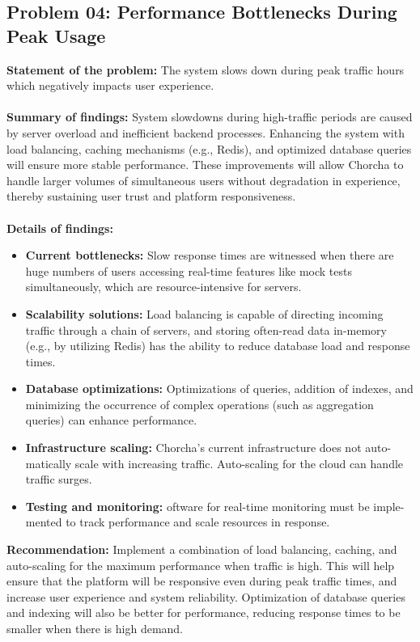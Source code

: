 \documentclass[12pt,a4paper,oneside]{book}
\begin{document}
\subsection{Problem 04: Performance Bottlenecks During Peak Usage}
\textbf{Statement of the problem:} The system slows down during peak traffic hours which negatively impacts user experience.\\ \\
\textbf{Summary of findings:} System slowdowns during high-traffic periods are caused by server overload and inefficient backend processes. Enhancing the system with load balancing, caching mechanisms (e.g., Redis), and optimized database queries will ensure more stable performance. These improvements will allow Chorcha to handle larger volumes of simultaneous users without degradation in experience, thereby sustaining user trust and platform responsiveness.
\\ \\
\textbf{Details of findings:}
\begin{itemize}
    \item \textbf{Current bottlenecks:} Slow response times are witnessed when there are huge numbers of users accessing real-time features like mock tests simultaneously, which are resource-intensive for servers.
    \item \textbf{Scalability solutions:} Load balancing is capable of directing incoming traffic through a chain of servers, and storing often-read data in-memory (e.g., by utilizing Redis) has the ability to reduce database load and response times.
    \item \textbf{Database optimizations:} Optimizations of queries, addition of indexes, and minimizing the occurrence of complex operations (such as aggregation queries) can enhance performance.
    \item \textbf{Infrastructure scaling:} Chorcha's current infrastructure does not auto-matically scale with increasing traffic. Auto-scaling for the cloud can handle traffic surges.
    \item \textbf{Testing and monitoring:} oftware for real-time monitoring must be imple-mented to track performance and scale resources in response.
\end{itemize}
\textbf{Recommendation:} Implement a combination of load balancing, caching, and auto-scaling for the maximum performance when traffic is high. This will help ensure that the platform will be responsive even during peak traffic times, and increase user experience and system reliability. Optimization of database queries and indexing will also be better for performance, reducing response times to be smaller when there is high demand.
\end{document}
